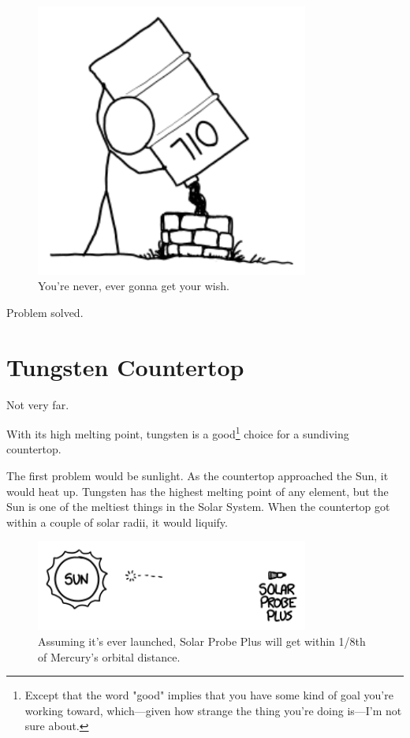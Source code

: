 {\begin{figure}[!htbp]
\centering
\includegraphics[scale=0.5, max width=0.8\textwidth]{imgs/a/88/soda_ground.png}
\caption{You're never, ever gonna get your wish.}
\end{figure}

{Problem solved.}

{
\chapter{Tungsten Countertop}
}

\hfill{}

{Not very far.}

{With its high melting point, tungsten is a good{\footnote{Except that the word "good" implies that you have some kind of goal you're working toward, which—given how strange the thing you're doing is—I'm not sure about.} } choice for a sundiving countertop.}

{The first problem would be sunlight. As the countertop approached the Sun, it would heat up. Tungsten has the highest melting point of any element, but the Sun is one of the meltiest things in the Solar System. When the countertop got within a couple of solar radii, it would liquify.}

\begin{figure}[!htbp]
\centering
\includegraphics[scale=0.5, max width=0.8\textwidth]{imgs/a/89/sun_diagram.png}
\caption{Assuming it's ever launched, Solar Probe Plus will get within 1/8th of Mercury's orbital distance.}
\end{figure}

}
